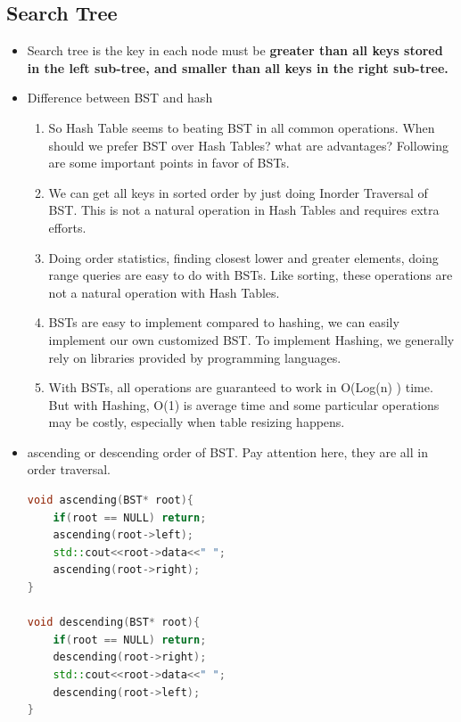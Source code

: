 \documentclass[a4paper,11pt,twoside]{book}
\begin{document}
\subsection{Search Tree}
\begin{itemize}
\item Search tree is the key in each node must be \textbf{greater than all keys stored in the left sub-tree, and smaller than all keys in the right sub-tree.} 

\item Difference between BST and hash
\begin{enumerate}
\item So Hash Table seems to beating BST in all common operations. When should we prefer BST over Hash Tables? what are advantages? Following are some important points in favor of BSTs.

\item We can get all keys in sorted order by just doing Inorder Traversal of BST. This is not a natural operation in Hash Tables and requires extra efforts.

\item Doing order statistics, finding closest lower and greater elements, doing range queries are easy to do with BSTs. Like sorting, these operations are not a natural operation with Hash Tables.

\item BSTs are easy to implement compared to hashing, we can easily implement our own customized BST. To implement Hashing, we generally rely on libraries provided by programming languages.

\item With BSTs, all operations are guaranteed to work in O(Log(n) ) time. But with Hashing, O(1) is average time and some particular operations may be costly, especially when table resizing happens.
\end{enumerate}

\item ascending or descending order of BST. Pay attention here, they are all in order traversal.
\begin{lstlisting}[frame=single, language=c++]
void ascending(BST* root){
    if(root == NULL) return;
    ascending(root->left);
    std::cout<<root->data<<" ";
    ascending(root->right);
}
 
void descending(BST* root){
    if(root == NULL) return;
    descending(root->right);
    std::cout<<root->data<<" ";
    descending(root->left);
}
\end{lstlisting}

\end{itemize}
\end{document}
